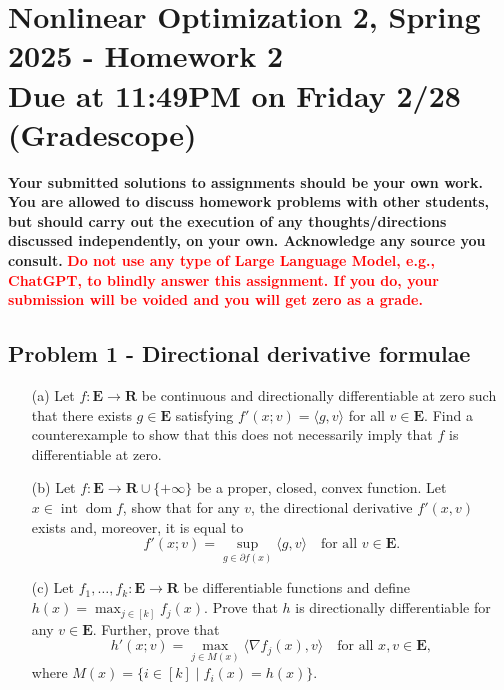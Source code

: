 \documentclass[11pt]{article}
\date{}
\title{}
\newcommand{\RR}{\mathbf{R}}
\newcommand{\EEE}{\mathbf{E}}
\newcommand{\dom}{\operatorname{dom}}
\begin{document}
\section*{\textbf{Nonlinear Optimization 2, Spring 2025 - Homework 2} \\ Due at 11:49PM on Friday 2/28 (Gradescope)}
\label{sec:org57c8f9d}
\textbf{Your submitted solutions to assignments should be your own work. You are allowed to discuss homework problems with other students, but should carry out the execution of any thoughts/directions discussed independently, on your own. Acknowledge any source you consult.}
\textbf{\textcolor{red}{Do not use any type of Large Language Model, e.g., ChatGPT, to blindly answer this assignment. If you do, your submission will be voided and you will get zero as a grade.}} \vspace{.5cm}
\subsection*{Problem 1 - Directional derivative formulae}
\label{sec:org8559f69}
\begin{itemize}
\item[(a)] Let $f \colon \EEE \rightarrow \RR$ be continuous and directionally differentiable at zero such that there exists $g\in \EEE$ satisfying  $f'(x; v) = \langle g, v \rangle$ for all $v \in \EEE$. Find a counterexample to show that this does not necessarily imply that $f$ is differentiable at zero.
\item[(b)] Let $f \colon \EEE \rightarrow \RR \cup \{+ \infty\}$ be a proper, closed, convex function. Let $x \in \operatorname{int} \dom f$, show that for any $v$, the directional derivative $f'(x, v)$ exists and, moreover, it is equal to $$ f'(x; v) = \sup_{g \in \partial f(x)} \langle g, v\rangle \quad \text{for all } v \in \EEE.$$
\item[(c)] Let $f_{1}, \dots, f_{k} \colon \EEE \rightarrow \RR$ be differentiable functions and define $h(x) = \max_{j \in [k]} f_{j}(x)$. Prove that $h$ is directionally differentiable for any $v \in \EEE.$ Further, prove that
$$
h'(x; v) = \max_{j \in M(x)} \langle \nabla f_{j}(x), v\rangle \quad \text{for all }x, v \in \EEE,
$$
where $M(x) = \{i \in [k] \mid f_{i}(x) = h(x)\}$.
\end{itemize}
\end{document}
